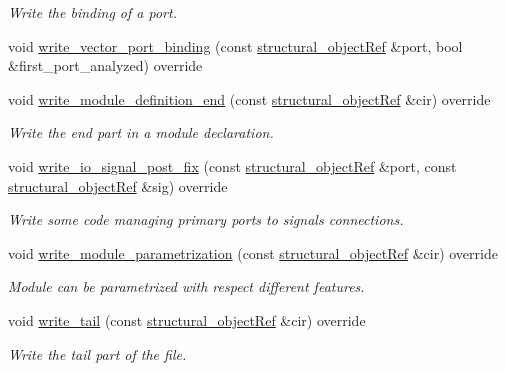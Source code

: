 \begin{DoxyCompactItemize}
\begin{DoxyCompactList}\small\item\em Write the binding of a port. \end{DoxyCompactList}\item 
void \hyperlink{structVHDL__writer_a8930dbb88b219d4ab659d65925541684}{write\+\_\+vector\+\_\+port\+\_\+binding} (const \hyperlink{structural__objects_8hpp_a8ea5f8cc50ab8f4c31e2751074ff60b2}{structural\+\_\+object\+Ref} \&port, bool \&first\+\_\+port\+\_\+analyzed) override
\item 
void \hyperlink{structVHDL__writer_af09ad7bcc11cb6cbcc0d92957db60283}{write\+\_\+module\+\_\+definition\+\_\+end} (const \hyperlink{structural__objects_8hpp_a8ea5f8cc50ab8f4c31e2751074ff60b2}{structural\+\_\+object\+Ref} \&cir) override
\begin{DoxyCompactList}\small\item\em Write the end part in a module declaration. \end{DoxyCompactList}\item 
void \hyperlink{structVHDL__writer_ad21dd69e82fa37e50df3660cd177da3c}{write\+\_\+io\+\_\+signal\+\_\+post\+\_\+fix} (const \hyperlink{structural__objects_8hpp_a8ea5f8cc50ab8f4c31e2751074ff60b2}{structural\+\_\+object\+Ref} \&port, const \hyperlink{structural__objects_8hpp_a8ea5f8cc50ab8f4c31e2751074ff60b2}{structural\+\_\+object\+Ref} \&sig) override
\begin{DoxyCompactList}\small\item\em Write some code managing primary ports to signals connections. \end{DoxyCompactList}\item 
void \hyperlink{structVHDL__writer_ad9ae71cdd9eefe75ccaffac7aad2c909}{write\+\_\+module\+\_\+parametrization} (const \hyperlink{structural__objects_8hpp_a8ea5f8cc50ab8f4c31e2751074ff60b2}{structural\+\_\+object\+Ref} \&cir) override
\begin{DoxyCompactList}\small\item\em Module can be parametrized with respect different features. \end{DoxyCompactList}\item 
void \hyperlink{structVHDL__writer_aaba770cf999a1be1ead3e65623adc02f}{write\+\_\+tail} (const \hyperlink{structural__objects_8hpp_a8ea5f8cc50ab8f4c31e2751074ff60b2}{structural\+\_\+object\+Ref} \&cir) override
\begin{DoxyCompactList}\small\item\em Write the tail part of the file. \end{DoxyCompactList}\item 

\end{DoxyCompactItemize}
